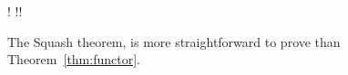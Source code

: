 \begin{theorem}\label{thm:squash}
	\begin{mathpar}
		{
			!\F {} !!\F
		}
	\end{mathpar}
\end{theorem}
The Squash theorem, is more straightforward to prove than Theorem~\ref{thm:functor}.

%




